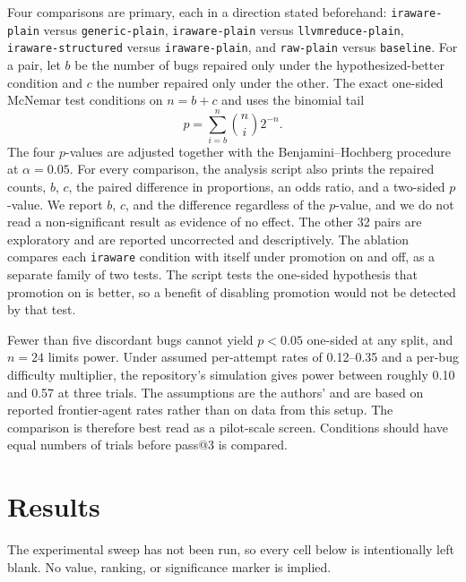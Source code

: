 \documentclass[conference]{IEEEtran}
\newcommand{\cn}[1]{\texttt{#1}}   %
\begin{document}
Four comparisons are primary, each in a direction stated beforehand: \cn{iraware-plain} versus \cn{generic-plain}, \cn{iraware-plain} versus \cn{llvmreduce-plain}, \cn{iraware-structured} versus \cn{iraware-plain}, and \cn{raw-plain} versus \cn{baseline}. For a pair, let $b$ be the number of bugs repaired only under the hypothesized-better condition and $c$ the number repaired only under the other. The exact one-sided McNemar test conditions on $n=b+c$ and uses the binomial tail
\begin{equation}
p=\sum_{i=b}^{n}\binom{n}{i}2^{-n}.
\end{equation}
The four $p$-values are adjusted together with the Benjamini--Hochberg procedure~\cite{benjamini1995fdr} at $\alpha=0.05$. For every comparison, the analysis script also prints the repaired counts, $b$, $c$, the paired difference in proportions, an odds ratio, and a two-sided $p$-value. We report $b$, $c$, and the difference regardless of the $p$-value, and we do not read a non-significant result as evidence of no effect. The other 32 pairs are exploratory and are reported uncorrected and descriptively. The ablation compares each \cn{iraware} condition with itself under promotion on and off, as a separate family of two tests. The script tests the one-sided hypothesis that promotion on is better, so a benefit of disabling promotion would not be detected by that test.

Fewer than five discordant bugs cannot yield $p<0.05$ one-sided at any split, and $n=24$ limits power. Under assumed per-attempt rates of 0.12--0.35 and a per-bug difficulty multiplier, the repository's simulation gives power between roughly 0.10 and 0.57 at three trials. The assumptions are the authors' and are based on reported frontier-agent rates rather than on data from this setup. The comparison is therefore best read as a pilot-scale screen. Conditions should have equal numbers of trials before pass@3 is compared.

\section{Results}

The experimental sweep has not been run, so every cell below is intentionally left blank. No value, ranking, or significance marker is implied.
\end{document}
